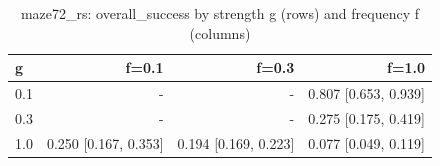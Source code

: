 \begin{table}[t]
\centering
\small
\begin{tabular}{lrrr}
\toprule
g & f=0.1 & f=0.3 & f=1.0 \\
\midrule
0.1 & - & - & 0.807 [0.653, 0.939] \\
0.3 & - & - & 0.275 [0.175, 0.419] \\
1.0 & 0.250 [0.167, 0.353] & 0.194 [0.169, 0.223] & 0.077 [0.049, 0.119] \\
\bottomrule
\end{tabular}
\caption{maze72\_rs: overall\_success by strength g (rows) and frequency f (columns)}
\label{tab:plasticity_maze72_rs_overall_success}
\end{table}